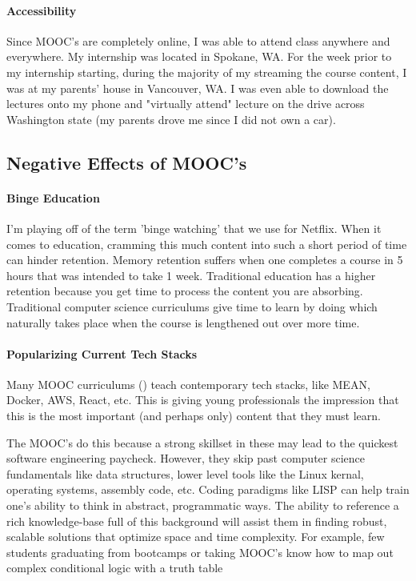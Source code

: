 \paragraph{Accessibility}
Since MOOC's are completely online, I was able to attend class anywhere and everywhere. My internship was located in Spokane, WA. For the week prior to my internship starting, during the majority of my streaming the course content, I was at my parents' house in Vancouver, WA. I was even able to download the lectures onto my phone and "virtually attend" lecture on the drive across Washington state (my parents drove me since I did not own a car).

\clearpage

\subsection{Negative Effects of MOOC's}

\paragraph{Binge Education}
I'm playing off of the term 'binge watching' that we use for Netflix. When it comes to education, cramming this much content into such a short period of time can hinder retention. Memory retention suffers when one completes a course in 5 hours that was intended to take 1 week. Traditional education has a higher retention because you get time to process the content you are absorbing. Traditional computer science curriculums give time to learn by doing which naturally takes place when the course is lengthened out over more time.

\paragraph{Popularizing Current Tech Stacks}
Many MOOC curriculums () teach contemporary tech stacks, like MEAN, Docker, AWS, React, etc. This is giving young professionals the impression that this is the most important (and perhaps only) content that they must learn.

The MOOC's do this because a strong skillset in these may lead to the quickest software engineering paycheck. However, they skip past computer science fundamentals like data structures, lower level tools like the Linux kernal, operating systems, assembly code, etc. Coding paradigms like LISP can help train one's ability to think in abstract, programmatic ways. The ability to reference a rich knowledge-base full of this background will assist them in finding robust, scalable solutions that optimize space and time complexity. For example, few students graduating from bootcamps or taking MOOC's know how to map out complex conditional logic with a truth table

